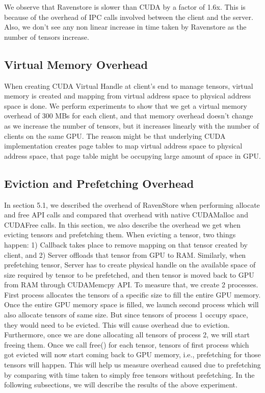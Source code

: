 \documentclass{article}
\begin{document}
We observe that Ravenstore is slower than CUDA by a factor of 1.6x. This is because of the overhead of IPC calls involved between the client and the server. Also, we don't see any non linear increase in time taken by Ravenstore as the number of tensors increase.

\subsection{Virtual Memory Overhead}
When creating CUDA Virtual Handle at client's end to manage tensors, virtual memory is created and mapping from
virtual address space to physical address space is done. We perform experiments to show that we get a virtual memory overhead
of 300 MBs for each client, and that memory overhead doesn't change as we increase the number of tensors, but it increases linearly
with the number of clients on the same GPU. The reason might be that underlying CUDA implementation creates page tables to map virtual address space
to physical address space, that page table might be occupying large amount of space in GPU.

\subsection{Eviction and Prefetching Overhead}
In section 5.1, we described the overhead of RavenStore when performing allocate and free API calls and compared that overhead with 
native CUDAMalloc and CUDAFree calls. In this section, we also describe the overhead we get when evicting tensors and prefetching them.
When evicting a tensor, two things happen: 1) Callback takes place to remove mapping on that tensor created by client, and 2) Server
offloads that tensor from GPU to RAM. Similarly, when prefetching tensor, Server has to create physical handle on the available space of
size required by tensor to be prefetched, and then tensor is moved back to GPU from RAM through CUDAMemcpy API.
To measure that, we create 2 processes. First process allocates the tensors of a specific size to fill the entire GPU memory. Once the entire GPU
memory space is filled, we launch second process which will also allocate tensors of same size. But since tensors of process 1 occupy space, they would
need to be evicted. This will cause overhead due to eviction. Furthermore, once we are done allocating all tensors of process 2, we will start freeing them.
Once we call free() for each tensor, tensors of first process which got evicted will now start coming back to GPU memory, i.e., prefetching for those
tensors will happen. This will help us measure overhead caused due to prefetching by comparing with time taken to simply free tensors without prefetching.
In the following subsections, we will describe the results of the above experiment.
\end{document}
